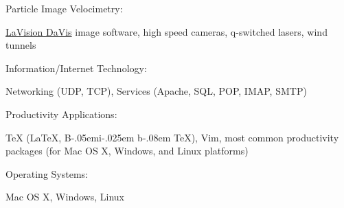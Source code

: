 \documentclass[11pt]{article}
\renewcommand{\section}[1]{\pagebreak[3]%
    \vspace{1.3\baselineskip}%
    \phantomsection\addcontentsline{toc}{section}{#1}%
    \noindent\llap{\scshape\smash{\parbox[t]{\marginparwidth}{\hyphenpenalty=10000\raggedright #1}}}%
    \vspace{-\baselineskip}\par}
\newcommand{\blankline}{\quad\pagebreak[3]}
\newcommand{\halfblankline}{\quad\vspace{-0.5\baselineskip}\pagebreak[3]}
\providecommand\BibTeX{{B\kern-.05em{\sc i\kern-.025em b}\kern-.08em
    \TeX}}
\begin{document}
Particle Image Velocimetry:
\begin{innerlist}
    \item \href{http://www.lavision.de/en/products/davis.php}{LaVision DaVis} image software, high speed cameras, q-switched lasers, wind tunnels
\end{innerlist}


\blankline


Information/Internet Technology:
\begin{innerlist}
    \item Networking (UDP, TCP), Services (Apache, SQL, POP, IMAP, SMTP) 
\end{innerlist}


\blankline


Productivity Applications:
\begin{innerlist}
    \item \TeX{} (\LaTeX{}, \BibTeX{}), Vim, most common productivity packages (for Mac OS X, Windows, and Linux platforms)
\end{innerlist}


\blankline


Operating Systems:
\begin{innerlist}
    \item Mac OS X, Windows, Linux 
\end{innerlist}










\end{document}
